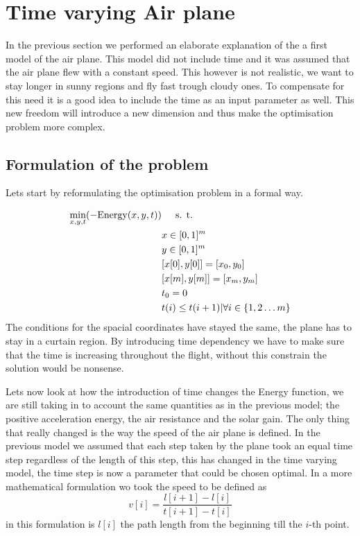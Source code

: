 \documentclass[ twoside,openright,titlepage,numbers=noenddot,headinclude,%
                footinclude=true,cleardoublepage=empty,abstractoff, %
                BCOR=5mm,paper=a4,fontsize=11pt,%
                ngerman,american,%
                ]{scrreprt}
\begin{document}
\section{Time varying Air plane}

In the previous section we performed an elaborate explanation of the a first model of the air plane.
This model did not include time  and it was assumed that the air plane flew with a constant speed.
This however is not realistic, we want to stay longer in sunny regions and fly fast trough cloudy ones.
To compensate for this need it is a good idea to include the time as an input parameter as well.
This new freedom will introduce a new dimension and thus make the optimisation problem more complex.

\subsection{Formulation of the problem}

Lets start by reformulating the optimisation problem in a formal way.

\begin{align}
       \min_{x,y,t }( -\text{Energy}(x,y,t)) & \hspace{5mm}  \text{s. t. } \\
		& x \in [0,1]^m\\
		& y \in [0,1]^m\\
		& [x[0],y[0]] = [x_0,y_0] \\
		& [x[m],y[m]] = [x_m,y_m] \\
		& t_0 = 0\\
		& t(i) \leq t(i+1)| \forall i \in \left\{1,2 \dots m\right\}
\end{align}
The conditions for the spacial coordinates have stayed the same, the plane has to stay in a curtain region.
By introducing time dependency we have to make sure that the time is increasing throughout the flight, without this constrain the solution would be nonsense.

Lets now look at how the introduction of time changes the Energy function, we are still taking in to account the same quantities as in the previous model; the positive acceleration energy, the air resistance and the solar gain.
The only  thing that really changed is the way the speed of the air plane is defined.
In the previous model we assumed that each step taken by the plane took an equal time step regardless of the length of this step, this has changed in the time varying model, the time step is now a parameter that could be chosen optimal.
In a more mathematical formulation wo took the speed to be defined as
\begin{equation}
v[i] = \dfrac{l[i+1]-l[i]}{t[i+1]-t[i]}
\end{equation}
in this formulation is $ l[i] $ the path length  from the beginning till the $i$-th point.
\end{document}

